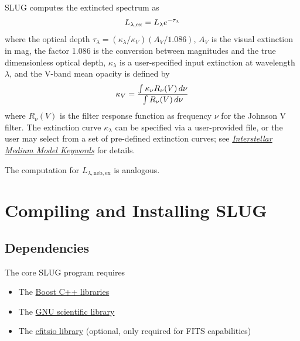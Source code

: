 \documentclass[letterpaper,10pt,english]{sphinxmanual}
\begin{document}
SLUG computes the extincted spectrum as
\begin{gather}
\begin{split}L_{\lambda,\mathrm{ex}} = L_{\lambda} e^{-\tau_\lambda}\end{split}\notag
\end{gather}
where the optical depth \(\tau_\lambda = (\kappa_\lambda / \kappa_V) (A_V/1.086)\), \(A_V\) is the visual extinction in mag, the factor 1.086 is the conversion between magnitudes and the true dimensionless optical depth, \(\kappa_\lambda\) is a user-specified input extinction at wavelength \(\lambda\), and the V-band mean opacity is defined by
\begin{gather}
\begin{split}\kappa_V = \frac{\int \kappa_\nu R_\nu(V) \, d\nu}{\int R_\nu(V) \, d\nu}\end{split}\notag
\end{gather}
where \(R_\nu(V)\) is the filter response function as frequency \(\nu\) for the Johnson V filter. The extinction curve \(\kappa_\lambda\) can be specified via a user-provided file, or the user may select from a set of pre-defined extinction curves; see {\hyperref[parameters:ssec-ism-keywords]{\emph{Interstellar Medium Model Keywords}}} for details.

The computation for \(L_{\lambda,\mathrm{neb,ex}}\) is analogous.


\chapter{Compiling and Installing SLUG}
\label{compiling::doc}\label{compiling:compiling-and-installing-slug}

\section{Dependencies}
\label{compiling:dependencies}
The core SLUG program requires
\begin{itemize}
\item {} 
The \href{http://www.boost.org/}{Boost C++ libraries}

\item {} 
The \href{http://www.gnu.org/software/gsl/}{GNU scientific library}

\item {} 
The \href{http://heasarc.gsfc.nasa.gov/fitsio/fitsio.html}{cfitsio library} (optional, only required for FITS capabilities)

\end{itemize}
\end{document}
